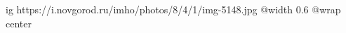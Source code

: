  
 
 
 
 

\ifcmt
  ig https://i.novgorod.ru/imho/photos/8/4/1/img-5148.jpg
  @width 0.6
  @wrap center
\fi
